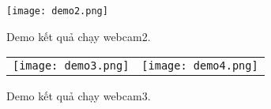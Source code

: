 \begin{figure}[h!]
	\centering
	\texttt{[image: demo2.png]}
	\caption[Demo kết quả chạy webcam2.]{Demo kết quả chạy webcam2.}
	\label{fig:demo2} 
\end{figure}

\begin{figure}[h!] 
	\begin{tabular}{cc}
		\centering
		\texttt{[image: demo3.png]} &
		\texttt{[image: demo4.png]} 
	\end{tabular}
	\caption[Demo kết quả chạy webcam3.]{Demo kết quả chạy webcam3.}
	\label{fig:demo3}
\end{figure}








